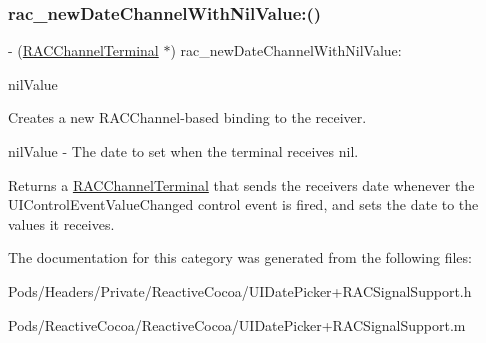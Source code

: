 \subsubsection{\texorpdfstring{rac\+\_\+new\+Date\+Channel\+With\+Nil\+Value\+:()}{rac\_newDateChannelWithNilValue:()}\hspace{0.1cm}{\footnotesize\ttfamily [3/3]}}
{\footnotesize\ttfamily -\/ (\mbox{\hyperlink{interface_r_a_c_channel_terminal}{R\+A\+C\+Channel\+Terminal}} $\ast$) rac\+\_\+new\+Date\+Channel\+With\+Nil\+Value\+: \begin{DoxyParamCaption}\item[{(N\+S\+Date $\ast$)}]{nil\+Value }\end{DoxyParamCaption}}

Creates a new R\+A\+C\+Channel-\/based binding to the receiver.

nil\+Value -\/ The date to set when the terminal receives {\ttfamily nil}.

Returns a \mbox{\hyperlink{interface_r_a_c_channel_terminal}{R\+A\+C\+Channel\+Terminal}} that sends the receiver\textquotesingle{}s date whenever the U\+I\+Control\+Event\+Value\+Changed control event is fired, and sets the date to the values it receives. 

The documentation for this category was generated from the following files\+:\begin{DoxyCompactItemize}
\item 
Pods/\+Headers/\+Private/\+Reactive\+Cocoa/U\+I\+Date\+Picker+\+R\+A\+C\+Signal\+Support.\+h\item 
Pods/\+Reactive\+Cocoa/\+Reactive\+Cocoa/U\+I\+Date\+Picker+\+R\+A\+C\+Signal\+Support.\+m\end{DoxyCompactItemize}
